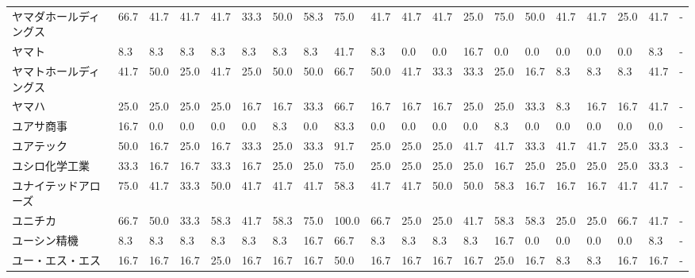 \begin{tabular}{llllllllllllllllllll}
ヤマダホールディングス     &   66.7 &   41.7 &      41.7 &      41.7 &       33.3 &   50.0 &   58.3 &   75.0 &    41.7 &    41.7 &   41.7 &  25.0 &   75.0 &    50.0 &    41.7 &  41.7 &  25.0 &  41.7 &     - \\
ヤマト             &    8.3 &    8.3 &       8.3 &       8.3 &        8.3 &    8.3 &    8.3 &   41.7 &     8.3 &     0.0 &    0.0 &  16.7 &    0.0 &     0.0 &     0.0 &   0.0 &   0.0 &   8.3 &     - \\
ヤマトホールディングス     &   41.7 &   50.0 &      25.0 &      41.7 &       25.0 &   50.0 &   50.0 &   66.7 &    50.0 &    41.7 &   33.3 &  33.3 &   25.0 &    16.7 &     8.3 &   8.3 &   8.3 &  41.7 &     - \\
ヤマハ             &   25.0 &   25.0 &      25.0 &      25.0 &       16.7 &   16.7 &   33.3 &   66.7 &    16.7 &    16.7 &   16.7 &  25.0 &   25.0 &    33.3 &     8.3 &  16.7 &  16.7 &  41.7 &     - \\
ユアサ商事           &   16.7 &    0.0 &       0.0 &       0.0 &        0.0 &    8.3 &    0.0 &   83.3 &     0.0 &     0.0 &    0.0 &   0.0 &    8.3 &     0.0 &     0.0 &   0.0 &   0.0 &   0.0 &     - \\
ユアテック           &   50.0 &   16.7 &      25.0 &      16.7 &       33.3 &   25.0 &   33.3 &   91.7 &    25.0 &    25.0 &   25.0 &  41.7 &   41.7 &    33.3 &    41.7 &  41.7 &  25.0 &  33.3 &     - \\
ユシロ化学工業         &   33.3 &   16.7 &      16.7 &      33.3 &       16.7 &   25.0 &   25.0 &   75.0 &    25.0 &    25.0 &   25.0 &  25.0 &   16.7 &    25.0 &    25.0 &  25.0 &  25.0 &  33.3 &     - \\
ユナイテッドアローズ      &   75.0 &   41.7 &      33.3 &      50.0 &       41.7 &   41.7 &   41.7 &   58.3 &    41.7 &    41.7 &   50.0 &  50.0 &   58.3 &    16.7 &    16.7 &  16.7 &  41.7 &  41.7 &     - \\
ユニチカ            &   66.7 &   50.0 &      33.3 &      58.3 &       41.7 &   58.3 &   75.0 &  100.0 &    66.7 &    25.0 &   25.0 &  41.7 &   58.3 &    58.3 &    25.0 &  25.0 &  66.7 &  41.7 &     - \\
ユーシン精機          &    8.3 &    8.3 &       8.3 &       8.3 &        8.3 &    8.3 &   16.7 &   66.7 &     8.3 &     8.3 &    8.3 &   8.3 &   16.7 &     0.0 &     0.0 &   0.0 &   0.0 &   8.3 &     - \\
ユー・エス・エス        &   16.7 &   16.7 &      16.7 &      25.0 &       16.7 &   16.7 &   16.7 &   50.0 &    16.7 &    16.7 &   16.7 &  16.7 &   25.0 &    16.7 &     8.3 &   8.3 &  16.7 &  16.7 &     - \\

\end{tabular}
